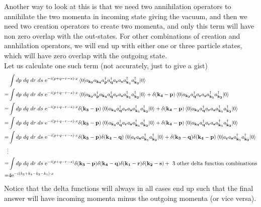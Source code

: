 \documentclass[11pt, notitlepage]{report}
\newcommand{\e}{\mathrm{e}}
\renewcommand{\a}[1]{a_\mathbf{#1}}
\newcommand{\adag}[1]{a^\dagger_\mathbf{#1}}
\numberwithin{equation}{section}
\begin{document}
{        Another way to look at this is that we need two annihilation operators to annihilate the two momenta in incoming state giving the vacuum, and then we need two creation operators to create two momenta, and only this term will have non zero overlap with the out-states. For other combinations of creation and annhilation operators, we will end up with either one or three particle states, which will have zero overlap with the outgoing state.\vspace{7pt}\\
        Let us calculate one such term (not accurately, just to give a gist)
        \begin{align*}
            &\int dp~dq~dr~ds~ \e^{-i(p+q-r-s)\cdot x}\braket{0|\a{k_3}\a{k_4} \adag{p}\adag{q}\a{r}\a{s} \adag{k_1} \adag{k_2}|0} \\
            =&\int dp~dq~dr~ds~ \e^{-i(p+q-r-s)\cdot x}\braket{0|\a{k_3} \adag{p}\a{k_4}\adag{q}\a{r}\a{s} \adag{k_1} \adag{k_2}|0} + \delta(\mathbf{k_4} - \textbf{p})\braket{0|\a{k_3} \adag{q}\a{r}\a{s} \adag{k_1} \adag{k_2}|0}\\
            =& \int dp~dq~dr~ds~ \e^{-i(p+q-r-s)\cdot x}\delta(\mathbf{k_3} - \textbf{p})\braket{0|\a{k_4}\adag{q}\a{r}\a{s} \adag{k_1} \adag{k_2}|0} + \delta(\mathbf{k_4} - \textbf{p})\braket{0|\a{k_3} \adag{q}\a{r}\a{s} \adag{k_1} \adag{k_2}|0}\\
            =&  \int dp~dq~dr~ds~ \e^{-i(p+q-r-s)\cdot x}\delta(\mathbf{k_3} - \textbf{p})\braket{0|\a{k_4}\adag{q}\a{r}\a{s} \adag{k_1} \adag{k_2}|0} + \delta(\mathbf{k_4} - \textbf{p})\braket{0|\a{k_3} \adag{q}\a{r}\a{s} \adag{k_1} \adag{k_2}|0}\\
            =& \int dp~dq~dr~ds~ \e^{-i(p+q-r-s)\cdot x}\delta(\mathbf{k_3} - \textbf{p})\delta(\mathbf{k_4} - \textbf{q})\braket{0|\a{r}\a{s} \adag{k_1} \adag{k_2}|0} + \delta(\mathbf{k_3} - \textbf{q})\delta(\mathbf{k_4} - \textbf{p})\braket{0|\a{r}\a{s} \adag{k_1} \adag{k_2}|0}\\
            \vdots \\
            =& \int dp~dq~dr~ds~ \e^{-i(p+q-r-s)} \delta(\mathbf{k_3} - \textbf{p})\delta(\mathbf{k_4} - \textbf{q})\delta(\mathbf{k_1} - \textbf{r})\delta(\mathbf{k_2} - \textbf{s}) + \text{~3 other delta function combinations}\\
            =& 4 \e^{-i(k_3 + k_4 - k_2 - k_1)\cdot x}
        \end{align*}
        Notice that the delta functions will always in all cases end up such that the final answer will have incoming momenta minus the outgoing momenta (or vice versa). \\
}
\end{document}
